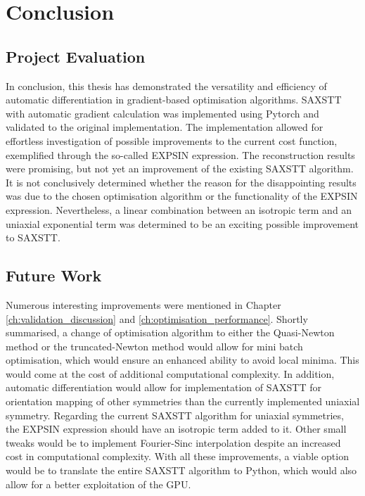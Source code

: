 \chapter{Conclusion}

\section{Project Evaluation}

In conclusion, this thesis has demonstrated the versatility and efficiency of automatic differentiation in gradient-based optimisation algorithms.
SAXSTT with automatic gradient calculation was implemented using Pytorch and validated to the original implementation.
The implementation allowed for effortless investigation of possible improvements to the current cost function, exemplified through the so-called EXPSIN expression.
The reconstruction results were promising, but not yet an improvement of the existing SAXSTT algorithm.
It is not conclusively determined whether the reason for the disappointing results was due to the chosen optimisation algorithm or the functionality of the EXPSIN expression.
Nevertheless, a linear combination between an isotropic term and an uniaxial exponential term was determined to be an exciting possible improvement to SAXSTT.




\section{Future Work}

Numerous interesting improvements were mentioned in Chapter \ref{ch:validation_discussion} and \ref{ch:optimisation_performance}.
Shortly summarised, a change of optimisation algorithm to either the Quasi-Newton method or the truncated-Newton method would allow for mini batch optimisation,
which would ensure an enhanced ability to avoid local minima. This would come at the cost of additional computational complexity.
In addition, automatic differentiation would allow for implementation of SAXSTT for orientation mapping of other symmetries than the currently implemented uniaxial symmetry.
Regarding the current SAXSTT algorithm for uniaxial symmetries, the EXPSIN expression should have an isotropic term added to it.
Other small tweaks would be to implement Fourier-Sinc interpolation despite an increased cost in computational complexity.
With all these improvements, a viable option would be to translate the entire SAXSTT algorithm to Python, which would also allow for a better exploitation of the GPU.

